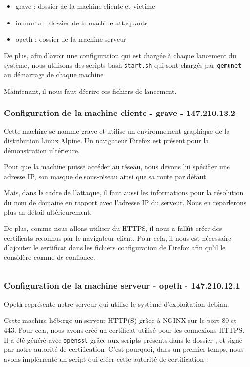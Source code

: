 \begin{itemize}
\item grave : dossier de la machine cliente et victime
\item immortal : dossier de la machine attaquante
\item opeth : dossier de la machine serveur
\end{itemize}

De plus, afin d'avoir une configuration qui est chargée à chaque lancement du système, nous utilisons des scripts bash \verb+start.sh+ qui sont chargés par \verb+qemunet+ au démarrage de chaque machine.

Maintenant, il nous faut décrire ces fichiers de lancement.

\subsubsection{Configuration de la machine cliente - grave - 147.210.13.2}
Cette machine se nomme grave et utilise un environnement graphique de la distribution Linux Alpine. Un navigateur Firefox est présent pour la démonstration ultérieure.

Pour que la machine puisse accéder au réseau, nous devons lui spécifier une adresse IP, son masque de sous-réseau ainsi que sa route par défaut.

Mais, dans le cadre de l'attaque, il faut aussi les informations pour la résolution du nom de domaine en rapport avec l'adresse IP du serveur. Nous en reparlerons plus en détail ultérieurement.

De plus, comme nous allons utiliser du HTTPS, il nous a fallût créer des certificats reconnus par le navigateur client. Pour cela, il nous est nécessaire d'ajouter le certificat dans les fichiers configuration de Firefox afin qu'il le considère comme de confiance.

\inputminted[bgcolor=lbcolor, breaklines]{shell}{../sslstrip2/grave/start.sh}

\subsubsection{Configuration de la machine serveur - opeth - 147.210.12.1}

Opeth représente notre serveur qui utilise le système d'exploitation debian.

Cette machine héberge un serveur HTTP(S) grâce à NGINX sur le port 80 et 443. Pour cela, nous avons créé un certificat utilisé pour les connexions HTTPS. Il a été généré avec \verb+openssl+ grâce aux scripts présents dans le dossier , et signé par notre autorité de certification. C'est pourquoi, dans un premier temps, nous avons implémenté un script qui créer cette autorité de certification :

